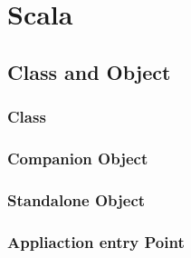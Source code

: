 \chapter{Scala}

\section{Class and Object}

\subsection{Class}

\subsection{Companion Object}

\subsection{Standalone Object}

\subsection{Appliaction entry Point}


